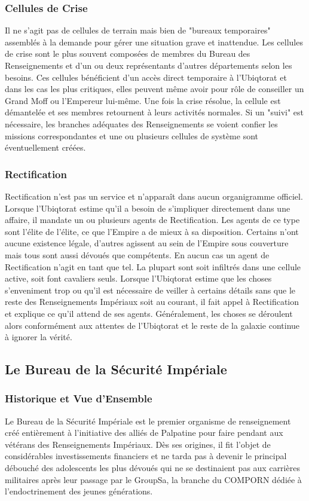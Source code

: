 \documentclass[twoside]{article}
\begin{document}
\subsubsection{Cellules de Crise}
Il ne s'agit pas de cellules de terrain mais bien de "bureaux temporaires" assemblés à la demande pour gérer une situation grave et inattendue. Les cellules de crise sont le plus souvent composées de membres du Bureau des Renseignements et d'un ou deux représentants d'autres départements selon les besoins. Ces cellules bénéficient d'un accès direct temporaire à l'Ubiqtorat et dans les cas les plus critiques, elles peuvent même avoir pour rôle de conseiller un Grand Moff ou l'Empereur lui-même. Une fois la crise résolue, la cellule est démantelée et ses membres retournent à leurs activités normales. Si un "suivi" est nécessaire, les branches adéquates des Renseignements se voient confier les missions correspondantes et une ou plusieurs cellules de système sont éventuellement créées. 

\subsubsection{Rectification}
Rectification n'est pas un service et n'appara\^{i}t dans aucun organigramme officiel. Lorsque l'Ubiqtorat estime qu'il a besoin de s'impliquer directement dans une affaire, il mandate un ou plusieurs agents de Rectification. Les agents de ce type sont l'élite de l'élite, ce que l'Empire a de mieux à sa disposition. Certains n'ont aucune existence légale, d'autres agissent au sein de l'Empire sous couverture mais tous sont aussi dévoués que compétents. En aucun cas un agent de Rectification n'agit en tant que tel. La plupart sont soit infiltrés dans une cellule active, soit font cavaliers seuls. Lorsque l'Ubiqtorat estime que les choses s'enveniment trop ou qu'il est nécessaire de veiller à certains détails sans que le reste des Renseignements Impériaux soit au courant, il fait appel à Rectification et explique ce qu'il attend de ses agents. Généralement, les choses se déroulent alors conformément aux attentes de l'Ubiqtorat et le reste de la galaxie continue à ignorer la vérité.

\subsection{Le Bureau de la Sécurité Impériale}
\subsubsection{Historique et Vue d'Ensemble}
Le Bureau de la Sécurité Impériale est le premier organisme de renseignement créé entièrement à l'initiative des alliés de Palpatine pour faire pendant aux vétérans des Renseignements Impériaux. Dès ses origines, il fit l'objet de considérables investissements financiers et ne tarda pas à devenir le principal débouché des adolescents les plus dévoués qui ne se destinaient pas aux carrières militaires après leur passage par le GroupSa, la branche du COMPORN dédiée à l'endoctrinement des jeunes générations.\\
\end{document}

